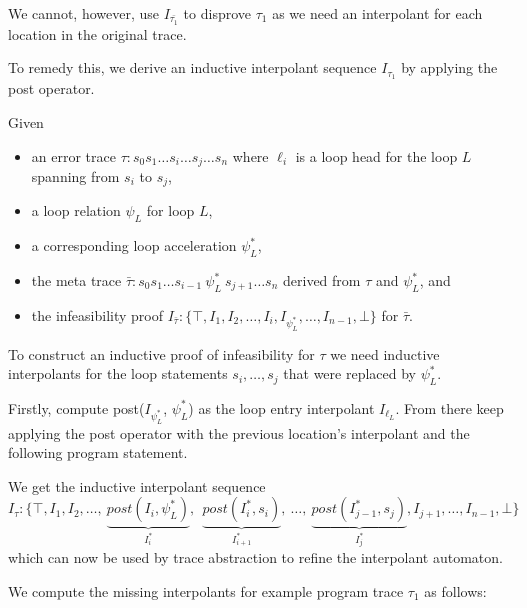 \documentclass{article}
\newcommand{\loc}[1]{\ensuremath{\ell_{#1}}}
\newcounter{example}[section]
\newcommand\mycom[1]{}
\newcommand\mycom[1]{#1}
\newcommand{\dd}[1]{\mycom{\todo[color=orange!40,inline]{\small DD: #1}}}
\newcommand{\ts}[1]{\mycom{\todo[color=green!40,inline]{\small TS: #1}}}
\begin{document}
\dd{Do you still need the line above?}

We cannot, however, use $I_{\bar{\tau_1}}$ to disprove $\tau_1$ as we need an interpolant for each location in the original trace.
\dd{say which one is missing ;)}
To remedy this, we derive an inductive interpolant sequence $I_{\tau_1}$ by applying the post operator.
\dd{Explain why we need post for the before-location, use the example here}

\newcommand{\accels}[1]{\ensuremath{\psi^{*}_{#1}}}
Given
\begin{itemize}[topsep=0pt,itemsep=-1ex,partopsep=1ex,parsep=1ex]
	\item an error trace $\tau: s_0 s_1 \ldots s_i \ldots s_j \ldots s_n$ where \loc{i} is a loop head for the loop $L$ spanning from $s_i$ to $s_j$,
	\item a loop relation $\psi_L$ for loop $L$,
	\item a corresponding loop acceleration \accels{L},
	\item the meta trace $\bar{\tau}: s_0 s_1 \ldots s_{i-1} \ \accels{L} \ s_{j+1} \ldots s_n$ derived from $\tau$ and \accels{L}, and
	\item the infeasibility proof $I_{\bar{\tau}}: \{\top, I_1, I_2, \ldots , I_i, I_{\psi^*_{L}}, \ldots , I_{n-1}, \bot \}$ for $\bar{\tau}$.
\end{itemize}
\dd{Fix indices s.t. we have the interpolant (sic!) before and after the loop acceleration}

To construct an inductive proof of infeasibility for $\tau$ we need inductive interpolants for the loop statements $s_i, \ldots , s_j$ that were replaced by $\psi^*_{L}$.

Firstly, compute post($I_{\psi^*_L}$, $\psi^*_L$) as the loop entry interpolant $I_{\loc{L}}$.
From there keep applying the post operator with the previous location's interpolant and the following program statement.

We get the inductive interpolant sequence
\begin{equation*}
	I_\tau: \{\top,I_1,I_2, \ldots ,\ \underbrace{post(I_i, \accels{L})}_{I_{i}^*},\ \ \underbrace{post(I_{i}^*, s_i)}_{I_{i+1}^*},\ \ldots ,\ \underbrace{post(I_{j-1}^*, s_j)}_{I_{j}^*},I_{j+1}, \ldots ,I_{n-1}, \bot \}
\end{equation*}
which can now be used by trace abstraction to refine the interpolant automaton.
\ts{Explain why this works and why it is necessary.}

We compute the missing interpolants for example program trace $\tau_1$ as follows:
\dd{Strange wording. This is just the continuaton of the example, right?}
\begin{comment}
\begin{figure}[H]
	\centering
	
	\captionof{figure}{Program trace $\tau_1$ of $P_1$ with inductive infeasibility proof.}
\end{figure}
\end{comment}
\end{document}
